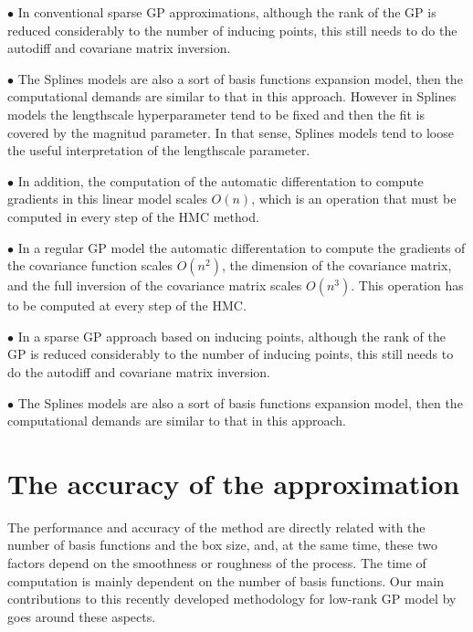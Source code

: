 \documentclass[]{interact}
\theoremstyle{plain}%
\theoremstyle{definition}
\theoremstyle{remark}
\begin{document}
\vspace{2mm}
$\bullet$ In conventional sparse GP approximations, although the rank of the GP is reduced considerably to the number of inducing points, this still needs to do the autodiff and covariane matrix inversion.

\vspace{2mm}
$\bullet$ The Splines models are also a sort of basis functions expansion model, then the computational demands are similar to that in this approach. However in Splines models the lengthscale hyperparameter tend to be fixed and then the fit is covered by the magnitud parameter. In that sense, Splines models tend to loose the useful interpretation of the lengthscale parameter.

\vspace{2mm}
$\bullet$ In addition, the computation of the automatic differentation to compute gradients in this linear model scales $O(n)$, which is an operation that must be computed in every step of the HMC method.

\vspace{2mm}
$\bullet$ In a regular GP model the automatic differentation to compute the gradients of the covariance function scales $O(n^2)$, the dimension of the covariance matrix, and the full inversion of the covariance matrix scales $O(n^3)$. This operation has to be computed at every step of the HMC.

\vspace{2mm}
$\bullet$ In a sparse GP approach based on inducing points, although the rank of the GP is reduced considerably to the number of inducing points, this still needs to do the autodiff and covariane matrix inversion.

\vspace{2mm}
$\bullet$ The Splines models are also a sort of basis functions expansion model, then the computational demands are similar to that in this approach.


\section{The accuracy of the approximation}

The performance and accuracy of the method are directly related with the number of basis functions and the box size, and, at the same time, these two factors depend on the smoothness or roughness of the process. The time of computation is mainly dependent on the number of basis functions. Our main contributions to this recently developed methodology for low-rank GP model by \cite{solin2018hilbert} goes around these aspects.
\end{document}
